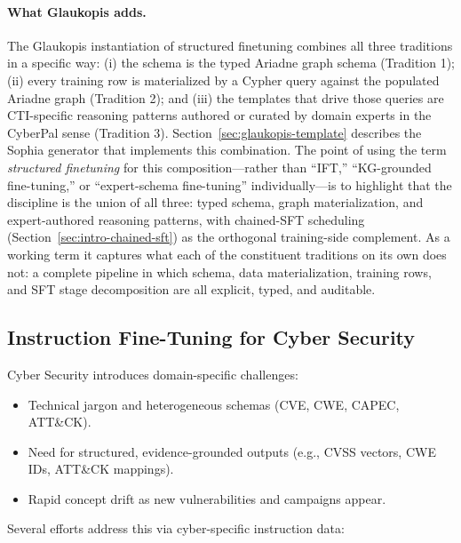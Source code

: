 \documentclass[unnumsec,webpdf,contemporary,large]{oup-authoring-template}
\theoremstyle{thmstyleone}
\theoremstyle{thmstyletwo}
\theoremstyle{thmstylethree}
\begin{document}
\paragraph{What Glaukopis adds.}
The Glaukopis instantiation of structured finetuning combines all three traditions in a specific way: (i) the schema is the typed Ariadne graph schema (Tradition 1); (ii) every training row is materialized by a Cypher query against the populated Ariadne graph (Tradition 2); and (iii) the templates that drive those queries are CTI-specific reasoning patterns authored or curated by domain experts in the CyberPal sense (Tradition 3). Section~\ref{sec:glaukopis-template} describes the Sophia generator that implements this combination. The point of using the term \emph{structured finetuning} for this composition---rather than ``IFT,'' ``KG-grounded fine-tuning,'' or ``expert-schema fine-tuning'' individually---is to highlight that the discipline is the union of all three: typed schema, graph materialization, and expert-authored reasoning patterns, with chained-SFT scheduling (Section~\ref{sec:intro-chained-sft}) as the orthogonal training-side complement. As a working term it captures what each of the constituent traditions on its own does not: a complete pipeline in which schema, data materialization, training rows, and SFT stage decomposition are all explicit, typed, and auditable.

\subsection{Instruction Fine-Tuning for Cyber Security}
\label{sec:ift-cyber}

Cyber Security introduces domain-specific challenges:

\begin{itemize}
  \item Technical jargon and heterogeneous schemas (CVE, CWE, CAPEC, ATT\&CK).
  \item Need for structured, evidence-grounded outputs (e.g., CVSS vectors, CWE IDs, ATT\&CK mappings).
  \item Rapid concept drift as new vulnerabilities and campaigns appear.
\end{itemize}

Several efforts address this via cyber-specific instruction data:
\end{document}
